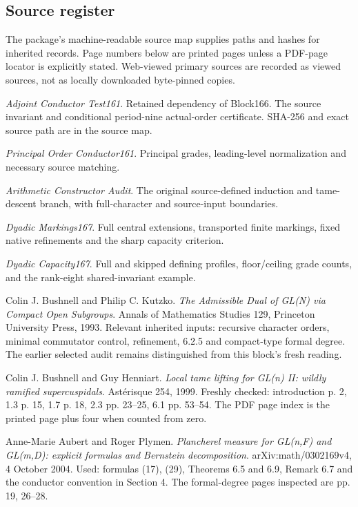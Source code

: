 \subsection{Source register}
The package's machine-readable source map supplies paths and hashes for inherited records. Page numbers below are printed pages unless a PDF-page locator is explicitly stated. Web-viewed primary sources are recorded as viewed sources, not as locally downloaded byte-pinned copies.

\begin{description}[style=nextline,leftmargin=1.5cm,labelwidth=1.35cm,font=\normalfont\bfseries,before=\raggedright]
\item[{[Q13]}] \emph{Adjoint Conductor Test161}. Retained dependency of Block166. The source invariant and conditional period-nine actual-order certificate. SHA-256 and exact source path are in the source map.
\item[{[Q14]}] \emph{Principal Order Conductor161}. Principal grades, leading-level normalization and necessary source matching.
\item[{[Q15]}] \emph{Arithmetic Constructor Audit}. The original source-defined induction and tame-descent branch, with full-character and source-input boundaries.
\item[{[Q16]}] \emph{Dyadic Markings167}. Full central extensions, transported finite markings, fixed native refinements and the sharp capacity criterion.
\item[{[D167]}] \emph{Dyadic Capacity167}. Full and skipped defining profiles, floor/ceiling grade counts, and the rank-eight shared-invariant example.
\item[{[BK]}] Colin J. Bushnell and Philip C. Kutzko. \emph{The Admissible Dual of GL(N) via Compact Open Subgroups}. Annals of Mathematics Studies 129, Princeton University Press, 1993. Relevant inherited inputs: recursive character orders, minimal commutator control, refinement, 6.2.5 and compact-type formal degree. The earlier selected audit remains distinguished from this block's fresh reading.
\item[{[BH99]}] Colin J. Bushnell and Guy Henniart. \emph{Local tame lifting for GL(n) II: wildly ramified supercuspidals}. Ast\'erisque 254, 1999. Freshly checked: introduction p. 2, 1.3 p. 15, 1.7 p. 18, 2.3 pp. 23--25, 6.1 pp. 53--54. The PDF page index is the printed page plus four when counted from zero.
\item[{[AP]}] Anne-Marie Aubert and Roger Plymen. \emph{Plancherel measure for GL(n,F) and GL(m,D): explicit formulas and Bernstein decomposition}. arXiv:math/0302169v4, 4 October 2004. Used: formulas (17), (29), Theorems 6.5 and 6.9, Remark 6.7 and the conductor convention in Section 4. The formal-degree pages inspected are pp. 19, 26--28.

\end{description}
